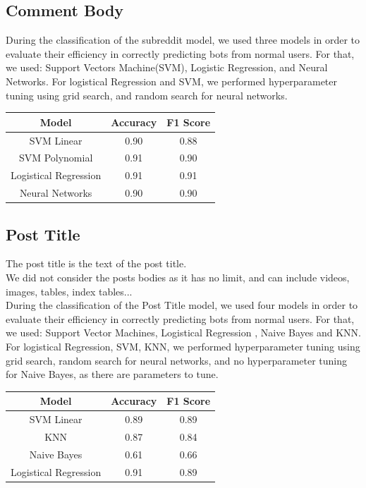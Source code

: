 \documentclass{article}
\begin{document}
    \subsection{Comment Body}
    During the classification of  the subreddit model, we used three models in order to evaluate their efficiency in correctly predicting bots from normal users. For that, we used: Support Vectors Machine(SVM), Logistic Regression, and Neural Networks.
    For logistical Regression and SVM, we performed hyperparameter tuning using grid search, and random search for neural networks.
        \begin{center}
    \begin{tabular}{|c || c| c|} 
     \hline
     Model & Accuracy  & F1 Score  \\ [0.5ex] 
     \hline\hline
     SVM Linear & 0.90  & 0.88 \\ 
     \hline
     SVM Polynomial & 0.91 &0.90 \\
     \hline
     Logistical Regression & 0.91 & 0.91  \\ 
     \hline
     Neural Networks & 0.90  & 0.90\\
     \hline

    \end{tabular}
    \end{center}


    \subsection{Post Title}
    The post title is the text of the post title. \\
    We did not consider the posts bodies as it has no limit, and can include videos, images, tables, index tables...\\
    During the classification of  the Post Title model, we used four models in order to evaluate their efficiency in correctly predicting bots from normal users. For that, we used:         Support Vector Machines, Logistical Regression , Naive Bayes and KNN.
    For logistical Regression, SVM, KNN, we performed hyperparameter tuning using grid search, random search for neural networks, and no hyperparameter tuning for Naive Bayes, as there are parameters to tune.

        \begin{center}
    \begin{tabular}{|c || c| c|} 
     \hline
     Model & Accuracy  & F1 Score  \\ [0.5ex] 
     \hline\hline
     SVM Linear & 0.89  & 0.89 \\ 
     \hline
     KNN & 0.87 & 0.84 \\
     \hline
     Naive Bayes & 0.61 &0.66 \\
     \hline
     Logistical Regression & 0.91 & 0.89  \\ 
     \hline
    \end{tabular}
    \end{center}
    
\end{document}
